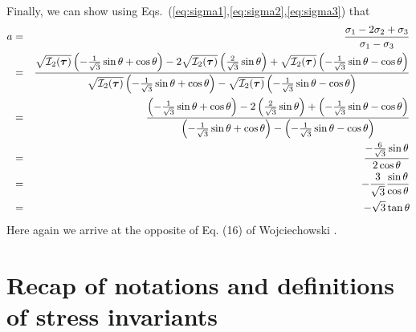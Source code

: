 Finally, we can show using Eqs.~(\ref{eq:sigma1},\ref{eq:sigma2},\ref{eq:sigma3}) that
\begin{eqnarray}
a 
&=&\frac{\sigma_1-2\sigma_2+\sigma_3}{\sigma_1-\sigma_3} \nonumber\\
&=& 
\frac{
\sqrt{{\cal I}_2({\bm \tau})} \left(-\frac{1}{\sqrt{3}}\sin \theta +\cos\theta \right) 
-2
\sqrt{{\cal I}_2({\bm \tau})} \left(\frac{2}{\sqrt{3}}\sin \theta   \right)   
+
\sqrt{{\cal I}_2({\bm \tau})} \left(-\frac{1}{\sqrt{3}}\sin \theta- \cos \theta \right)  
}{
\sqrt{{\cal I}_2({\bm \tau})} \left(-\frac{1}{\sqrt{3}}\sin \theta +\cos\theta \right)
- 
\sqrt{{\cal I}_2({\bm \tau})} \left(-\frac{1}{\sqrt{3}}\sin \theta- \cos \theta \right)  
}
\nonumber \\
&=& 
\frac{
\left(-\frac{1}{\sqrt{3}}\sin \theta +\cos\theta \right) 
-2
\left(\frac{2}{\sqrt{3}}\sin \theta   \right)   
+
\left(-\frac{1}{\sqrt{3}}\sin \theta- \cos \theta \right)  
}{
\left(-\frac{1}{\sqrt{3}}\sin \theta +\cos\theta \right)
- 
\left(-\frac{1}{\sqrt{3}}\sin \theta- \cos \theta \right)  
}
\nonumber \\
&=& 
\frac{
-\frac{6}{\sqrt{3}}\sin \theta  
}
{
2\cos\theta
}
\nonumber\\
&=& -\frac{3}{\sqrt{3}} \frac{\sin\theta}{\cos\theta} \nonumber\\
&=& -\sqrt{3} \tan\theta
\end{eqnarray}
Here again we arrive at the opposite of Eq. (16) of Wojciechowski \cite{wojc18}. 

\newpage

\section{Recap of notations and definitions of stress invariants \label{ss:recapInv}}























